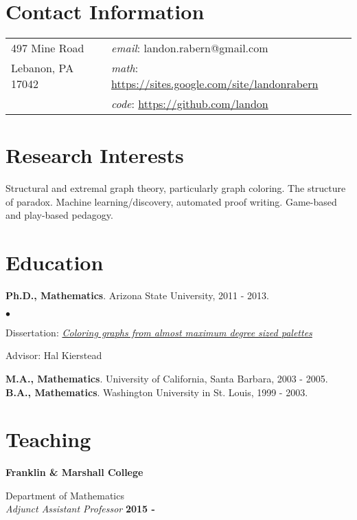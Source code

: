 \documentclass[margin,line]{res}
\newenvironment{list2}{
  \begin{list}{$\bullet$}{%
      \setlength{\itemsep}{0in}
      \setlength{\parsep}{0in} \setlength{\parskip}{0in}
      \setlength{\topsep}{0in} \setlength{\partopsep}{0in} 
      \setlength{\leftmargin}{0.2in}}}{\end{list}}
\begin{document}

\begin{resume}
\section{\sc Contact Information}
\vspace{.05in}
\begin{tabular}{@{}p{2in}p{4in}}     
497 Mine Road & \qquad\qquad\textit{email}: landon.rabern@gmail.com \\   
Lebanon, PA 17042 & \qquad\qquad \textit{math}: \url{https://sites.google.com/site/landonrabern} \\
& \qquad\qquad \textit{code}: \href{https://github.com/landon?tab=repositories}{https://github.com/landon}
\end{tabular}

\section{\sc Research Interests}
Structural and extremal graph theory, particularly graph coloring. The structure of paradox.
Machine learning/discovery, automated proof writing.  Game-based and play-based pedagogy.

\bigskip

\section{\sc Education}
{\bf Ph.D., Mathematics}. Arizona State University, 2011 - 2013.
\begin{list2}
\item Dissertation: \textit{\href{https://dl.dropbox.com/u/8609833/Papers/main_fancy.pdf}{Coloring graphs from almost maximum degree sized palettes}}
\item Advisor: Hal Kierstead
\end{list2}
{\bf M.A., Mathematics}. University of California, Santa Barbara, 2003 - 2005.\\
{\bf  B.A., Mathematics}. Washington University in St. Louis, 1999 - 2003.

\section{\sc Teaching}

{\bf Franklin \& Marshall College}

\vspace{-.4cm}
Department of Mathematics\\
{\em Adjunct Assistant Professor} \hfill {\bf 2015 - \phantom{2017}}


\end{resume}
\end{document}
